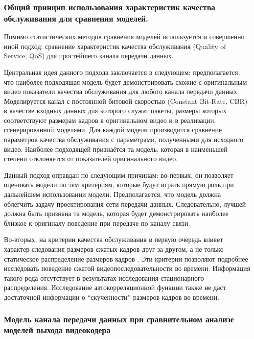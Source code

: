 \subsubsection{Общий принцип использования характеристик
качества обслуживания для сравнения моделей.}

\hspace{3pt}
Помимо статистических методов сравнения моделей используется
\cite{raey}
и совершенно иной подход: сравнение характеристик качества
обслуживания (Quality of Service, QoS) для простейшего
канала передачи данных.

Центральная идея данного подхода заключается в следующем:
предполагается, что наиболее подходящая модель будет демонстрировать
схожие с оригинальным видео показатели качества обслуживания
для любого канала передачи данных. Моделируется канал с постоянной
битовой скоростью (Constant Bit-Rate, CBR) в качестве входных
данных для которого служат пакеты, размеры которых соответствуют
размерам кадров в оригинальном видео и в реализации,
сгенерированной моделями. Для каждой модели производится сравнение
параметров качества обслуживания с параметрами, полученными
для исходного видео. Наиболее подходящей признаётся та модель,
которая в наименьшей степени отклоняется от показателей оригинального
видео.

Данный подход оправдан по следующим причинам: во-первых,
он позволяет оценивать модели по тем критериям, которые
будут играть прямую роль при дальнейшем использовании модели.
Предполагается, что модель должна облегчить задачу проектирования
сети передачи данных. Следовательно, лучшей должна быть признана
та модель, которая будет демонстрировать наиболее близкое
к оригиналу поведение при передаче по каналу связи.

Во-вторых, на критерии качества обслуживания в первую очередь
влияет характер следования размеров сжатых кадров друг за
другом, а не только статическое распределение размеров
кадров \cite{survey2013}.
Эти критерии позволяют подробнее исследовать поведение сжатой
видеопоследовательности во времени. Информация такого
рода отсутствует в результатах исследования стационарного
распределения. Исследование автокорреляционной функции
также не даст достаточной информации о ``скученности'' размеров
кадров во времени.

\subsubsection{Модель канала передачи данных при
сравнительном анализе моделей выхода видеокодера}
\hspace{3pt}

